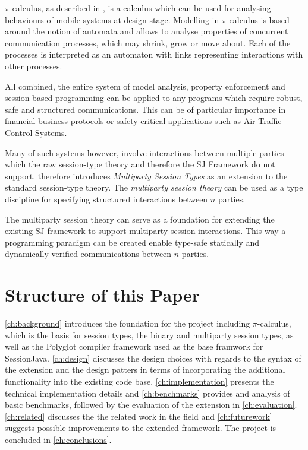 $\pi$-calculus, as described in \cite{pi-calculus}, is a calculus which can be used for analysing behaviours of mobile systems at design stage. Modelling in $\pi$-calculus is based around the notion of automata and allows to analyse properties of concurrent communication processes, which may shrink, grow or move about. Each of the processes is interpreted as an automaton with links representing interactions with other processes.

All combined, the entire system of model analysis, property enforcement and session-based programming can be applied to any programs which require robust, safe and structured communications. This can be of particular importance in financial business protocols or safety critical applications such as Air Traffic Control Systems.

Many of such systems however, involve interactions between multiple parties which the raw session-type theory and therefore the SJ Framework do not support. \cite{multiparty_sess_types} therefore introduces \textit{Multiparty Session Types} as an extension to the standard session-type theory. The \textit{multiparty session theory} can be used as a type discipline for specifying structured interactions between $n$ parties.

The multiparty session theory can serve as a foundation for extending the existing SJ framework to support multiparty session interactions. This way a programming paradigm can be created enable type-safe statically and dynamically verified communications between $n$ parties. 

\section{Structure of this Paper}

\autoref{ch:background} introduces the foundation for the project including $\pi$-calculus, which is the basis for session types, the binary and multiparty session types, as well as the Polyglot compiler framework used as the base framwork for SessionJava. \autoref{ch:design} discusses the design choices with regards to the syntax of the extension and the design patters in terms of incorporating the additional functionality into the existing code base. \autoref{ch:implementation} presents the technical implementation details and \autoref{ch:benchmarks} provides and analysis of basic benchmarks, followed by the evaluation of the extension in \autoref{ch:evaluation}. \autoref{ch:related} discusses the the related work in the field and \autoref{ch:futurework} suggests possible improvements to the extended framework. The project is concluded in \autoref{ch:conclusions}.


